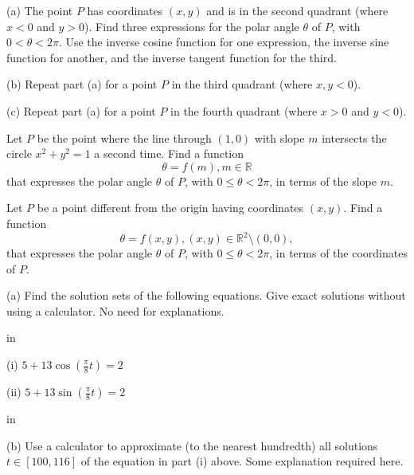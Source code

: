 \documentclass{ximera}
\newcommand{\pskip}{\vskip 0.1 in}
\begin{document}
\begin{question} \label{Q18:InverseTrig}
(a) The point $P$ has coordinates $(x,y)$ and is in the second quadrant (where $x<0$ and $y>0$). Find three expressions for the polar angle $\theta$ of $P$, with $0 < \theta < 2\pi$. Use the inverse cosine function for one expression, the inverse sine function for another, and the inverse tangent function for the third. 

(b) Repeat part (a) for a point $P$ in the third quadrant (where $x,y<0$).

(c) Repeat part (a) for a point $P$ in the fourth quadrant (where $x>0$ and $y<0$).
\end{question}



\begin{question} \label{Q19:InverseTrig}
Let $P$ be the point where the line through $(1,0)$ with slope $m$ intersects the circle $x^2+y^2=1$ a second time. Find a function 
\[
      \theta = f(m) , m \in \mathbb{R}
\] 
that expresses the polar angle $\theta$ of $P$, with $0 \leq  \theta < 2\pi$, in terms of the slope $m$. 
\end{question}

\begin{question} \label{Q20:InverseTrig}
Let $P$ be a point different from the origin having coordinates $(x,y)$. Find a function 
\[
      \theta = f(x,y) , (x,y) \in \mathbb{R}^2 \setminus {(0,0)} ,
\] 
that expresses the polar angle $\theta$ of $P$, with $0 \leq  \theta < 2\pi$, in terms of the coordinates of $P$.

\end{question}

\begin{question} \label{Q23:InverseTrig}
(a) Find the solution sets of the following equations. Give exact solutions without using a calculator. No need for explanations.

\pskip

(i) $5 + 13 \cos \left( \frac{\pi}{8}t \right) = 2$

(ii) $5 + 13 \sin \left( \frac{\pi}{8}t \right) = 2$

\pskip

(b) Use a calculator to approximate (to the nearest hundredth) all solutions $t\in [100, 116]$ of the equation in part (i) above. Some explanation required here.

\end{question}
\end{document}
